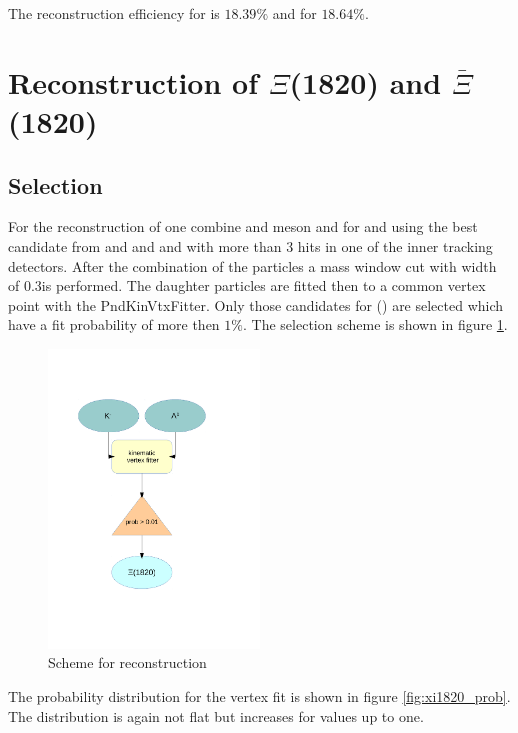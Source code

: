 		The reconstruction efficiency for \anticascade is $18.39\%$ and for \cascade $18.64\%$.
		
	
	
	

\section{Reconstruction of $\Xi$(1820) and $\bar{\Xi}$(1820)}
		\subsection*{Selection}

		For the reconstruction of \excitedcascade one combine \lam and \kminus meson and for \excitedanticascade \alam and \kplus using the
		best candidate from \lam and \alam and \kplus and \kminus with more than 3 hits in one of the inner tracking detectors.
		After the combination of the particles a mass window cut with width of $0.3$\massunit is performed. 
		The daughter particles are fitted then to a common vertex point with the PndKinVtxFitter.
		Only those candidates for \excitedcascade (\excitedanticascade) are selected which have a fit probability of more then $1\%$.
		The selection scheme is shown in figure \ref{fig:excitedcascade_scheme}. 
		
		\begin{figure}
			\centering
				\includegraphics[width=0.50\textwidth]{./plots/combineExcitedCascade.pdf}
			\caption{\propose Scheme for \excitedcascade reconstruction}
			\label{fig:excitedcascade_scheme}
		\end{figure}
		
		
		The \chisq probability distribution for the vertex fit is shown in figure \ref{fig:xi1820_prob}.
		The distribution is again not flat but increases for values up to one. 
		
